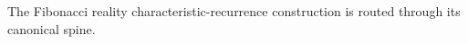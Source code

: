 The Fibonacci reality characteristic-recurrence construction is routed through its canonical spine.
